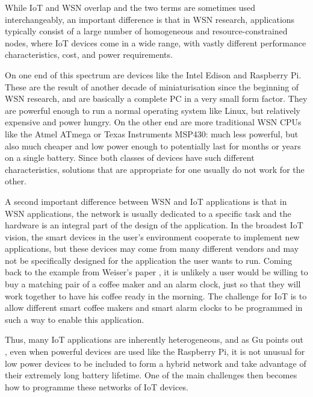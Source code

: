 While IoT and WSN overlap and the two terms are sometimes used interchangeably, an important difference is that in WSN research, applications typically consist of a large number of homogeneous and resource-constrained nodes, where IoT devices come in a wide range, with vastly different performance characteristics, cost, and power requirements.

On one end of this spectrum are devices like the Intel Edison and Raspberry Pi. These are the result of another decade of miniaturisation since the beginning of WSN research, and are basically a complete PC in a very small form factor. They are powerful enough to run a normal operating system like Linux, but relatively expensive and power hungry. On the other end are more traditional WSN CPUs like the Atmel ATmega or Texas Instruments MSP430: much less powerful, but also much cheaper and low power enough to potentially last for months or years on a single battery. Since both classes of devices have such different characteristics, solutions that are appropriate for one usually do not work for the other.

A second important difference between WSN and IoT applications is that in WSN applications, the network is usually dedicated to a specific task and the hardware is an integral part of the design of the application. In the broadest IoT vision, the smart devices in the user's environment cooperate to implement new applications, but these devices may come from many different vendors and may not be specifically designed for the application the user wants to run. Coming back to the example from Weiser's paper \cite{Weiser:1991wz}, it is unlikely a user would be willing to buy a matching pair of a coffee maker and an alarm clock, just so that they will work together to have his coffee ready in the morning. The challenge for IoT is to allow different smart coffee makers and smart alarm clocks to be programmed in such a way to enable this application.

Thus, many IoT applications are inherently heterogeneous, and as Gu points out \cite{Gu:2006ww}, even when powerful devices are used like the Raspberry Pi, it is not unusual for low power devices to be included to form a hybrid network and take advantage of their extremely long battery lifetime. One of the main challenges then becomes how to programme these networks of IoT devices.



